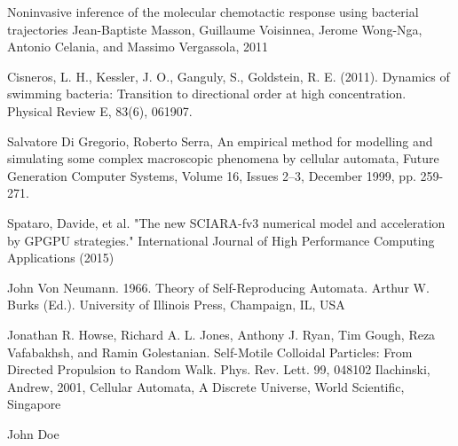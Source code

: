\documentclass[conference]{IEEEtran}
\begin{document}
\begin{thebibliography}{1}
Noninvasive inference of the molecular chemotactic response using bacterial trajectories Jean-Baptiste Masson, Guillaume Voisinnea, Jerome Wong-Nga, Antonio Celania, and Massimo Vergassola, 2011

Cisneros, L. H., Kessler, J. O., Ganguly, S.,  Goldstein, R. E. (2011). Dynamics of swimming bacteria: Transition to directional order at high concentration. Physical Review E, 83(6), 061907.

Salvatore Di Gregorio, Roberto Serra, An empirical method for modelling and simulating some complex macroscopic phenomena by cellular automata, Future Generation Computer Systems, Volume 16, Issues 2–3, December 1999, pp. 259-271.

Spataro, Davide, et al. "The new SCIARA-fv3 numerical model and acceleration by GPGPU strategies." International Journal of High Performance Computing Applications (2015)


John Von Neumann. 1966. Theory of Self-Reproducing Automata. Arthur W. Burks (Ed.). University of Illinois Press, Champaign, IL, USA

Jonathan R. Howse, Richard A. L. Jones, Anthony J. Ryan, Tim Gough, Reza Vafabakhsh, and Ramin Golestanian. Self-Motile Colloidal Particles: From Directed Propulsion to Random Walk. Phys. Rev. Lett. 99, 048102
Ilachinski, Andrew, 2001, Cellular Automata, A Discrete Universe, World Scientific,
Singapore

\end{thebibliography}

% 

\begin{IEEEbiography}{John Doe}
\blindtext
\end{IEEEbiography}



\end{document}
